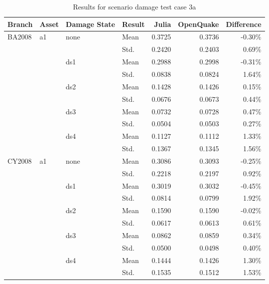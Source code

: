 \begin{table}[htbp]

\centering
\begin{tabular}{ l l l l r r r }

\hline
\rowcolor{anti-flashwhite}
\bf{Branch} & \bf{Asset} & \bf{Damage State} & \bf{Result} & \bf{Julia} & \bf{OpenQuake} & \bf{Difference}\\
\hline
BA2008 & a1 & none & Mean & 0.3725 & 0.3736 & -0.30\% \\
       &    &      & Std. & 0.2420 & 0.2403 & 0.69\% \\
       &    & ds1  & Mean & 0.2988 & 0.2998 & -0.31\% \\
       &    &      & Std. & 0.0838 & 0.0824 & 1.64\% \\
       &    & ds2  & Mean & 0.1428 & 0.1426 & 0.15\% \\
       &    &      & Std. & 0.0676 & 0.0673 & 0.44\% \\
       &    & ds3  & Mean & 0.0732 & 0.0728 & 0.47\% \\
       &    &      & Std. & 0.0504 & 0.0503 & 0.27\% \\
       &    & ds4  & Mean & 0.1127 & 0.1112 & 1.33\% \\
       &    &      & Std. & 0.1367 & 0.1345 & 1.56\% \\
\hline
CY2008 & a1 & none & Mean & 0.3086 & 0.3093 & -0.25\% \\
       &    &      & Std. & 0.2218 & 0.2197 & 0.92\% \\
       &    & ds1  & Mean & 0.3019 & 0.3032 & -0.45\% \\
       &    &      & Std. & 0.0814 & 0.0799 & 1.92\% \\
       &    & ds2  & Mean & 0.1590 & 0.1590 & -0.02\% \\
       &    &      & Std. & 0.0617 & 0.0613 & 0.61\% \\
       &    & ds3  & Mean & 0.0862 & 0.0859 & 0.34\% \\
       &    &      & Std. & 0.0500 & 0.0498 & 0.40\% \\
       &    & ds4  & Mean & 0.1444 & 0.1426 & 1.30\% \\
       &    &      & Std. & 0.1535 & 0.1512 & 1.53\% \\
\hline
\end{tabular}

\caption{Results for scenario damage test case 3a}
\label{tab:result-sd-3a}
\end{table}